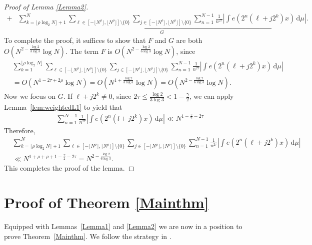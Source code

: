 \documentclass[10pt,a4paper]{amsart}
\numberwithin{equation}{section} %
\begin{document}
\begin{proof}[Proof of Lemma \ref{Lemma2}]
\begin{align*}
		+& \underbrace{\sum_{k=\lfloor\rho \log_{2}N \rfloor+1}^{N}\sum_{\ell\in [-\lfloor N^{ \rho}\rfloor,\lfloor N^{ \rho}\rfloor]\setminus\{0\}}\sum_{j\in [-\lfloor N^{ \rho}\rfloor,\lfloor N^{ \rho}\rfloor]\setminus\{0\}} \sum_{n=1}^{N-1}\frac{1}{n^{2\tau}}\left|\int e(2^{n}(\ell+j2^k)x)\, \mathrm{d}\mu\right|}_{G}.
	\end{align*}
	To complete the proof, it suffices to show that $F$ and $G$ are both $O\left(N^{2-\frac{\log2}{3\log3}}\log N\right).$ 
    The term $F$ is $O\left(N^{2-\frac{\log2}{6\log3}}\log N\right)$, since
	\begin{align*}
		&\sum_{k=1}^{\lfloor\rho \log_{2}N \rfloor}\sum_{\ell\in [-\lfloor N^{ \rho}\rfloor,\lfloor N^{ \rho}\rfloor]\setminus\{0\}}\! \sum_{j\in [-\lfloor N^{ \rho}\rfloor,\lfloor N^{ \rho}\rfloor]\setminus\{0\}} \!\sum_{n=1}^{N-1}\frac{1}{n^{2 \tau}}\left|\int e(2^{n}(\ell+j2^k)x)\, \mathrm{d}\mu\right| \\
        &=O(N^{1-2\tau+2\rho}\log N)
     =O\left(N^{1+\frac{\log2}{3\log3}}\log N\right)=O\left(N^{2-\frac{\log2}{6\log3}}\log N\right).
	\end{align*}
	 Now we focus on $G$. If $\ell+j2^{k}\neq 0$, since $2\tau\leq\frac{\log2}{3\log3}<1-\frac{\gamma}{2}$, we can apply Lemma~\ref{lem:weightedL1} to yield that
	\begin{align*}
		\sum_{n=1}^{N-1}\frac{1}{n^{2\tau}}\left|\int e(2^{n}(l+j2^k)x)\, \mathrm{d}\mu\right|\ll N^{1-\frac{\gamma}{2}-2\tau}
	\end{align*}
	Therefore, 
	\begin{align*}
		&\sum_{k=\lfloor\rho\log_{2}N \rfloor+1}^{N}\sum_{\ell\in [-\lfloor N^{ \rho}\rfloor,\lfloor N^{ \rho}\rfloor]\setminus\{0\}}\sum_{j\in [-\lfloor N^{\rho} \rfloor,\lfloor N^{ \rho}\rfloor]\setminus\{0\}} \sum_{n=1}^{N-1}\frac{1}{n^{2\tau}}\left|\int e(2^{n}(\ell+j2^k)x)\, \mathrm{d}\mu\right| \\
		&\ll N^{1+\rho+\rho+1-\frac{\gamma}{2}-2\tau}
		=N^{2-\frac{\log2}{6\log3}}.
	\end{align*}
	This completes the proof of the lemma.  
\end{proof}


\section{Proof of Theorem \ref{Mainthm}}\label{Sec:Mainthm}

Equipped with Lemmas~\ref{Lemma1} and  \ref{Lemma2} we are now in a position to prove Theorem~\ref{Mainthm}. We follow the strategy in \cite[Section 2.3]{Baker25A}. 
\end{document}
